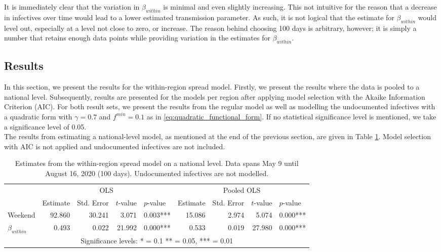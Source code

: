\documentclass[12pt]{article}
\begin{document}
	It is immediately clear that the variation in $\beta_{within}$ is minimal and even slightly increasing. This not intuitive for the reason that a decrease in infectives over time would lead to a lower estimated transmission parameter. As such, it is not logical that the estimate for $\beta_{within}$ would level out, especially at a level not close to zero, or increase. The reason behind choosing 100 days is arbitrary, however; it is simply a number that retains enough data points while providing variation in the estimates for $\beta_{within}$.
	
    \subsection{Results} \label{subsec:model_within_results}
	In this section, we present the results for the within-region spread model. Firstly, we present the results where the data is pooled to a national level. Subsequently, results are presented for the models per region after applying model selection with the Akaike Information Criterion (AIC). For both result sets, we present the results from the regular model as well as modelling the undocumented infectives with a quadratic form with $\gamma = 0.7$ and $f^{min} = 0.1$ as in \eqref{eq:quadratic_functional_form}. If no statistical significance level is mentioned, we take a significance level of 0.05. \\
	
	The results from estimating a national-level model, as mentioned at the end of the previous section, are given in Table \ref{tab:results_within_national}. Model selection with AIC is not applied and undocumented infectives are not included.
	
	\begin{table}[H]
	    \centering
	    \caption{Estimates from the within-region spread model on a national level. Data spans May 9 until August 16, 2020 (100 days). Undocumented infectives are not modelled.}
		\label{tab:results_within_national}
	    \begin{tabular}{lrrrlrrrl}
	        \toprule
    		& \multicolumn{4}{c}{OLS} & \multicolumn{4}{c}{Pooled OLS} \\
    		                \cmidrule(lr){2-5}
                            \cmidrule(lr){6-9}
    		& Estimate & Std. Error & $t$-value & $p$-value & Estimate & Std. Error & $t$-value & $p$-value \\* \midrule
    		Weekend             & 92.860 & 30.241 & 3.071 & 0.003*** & 15.086 & 2.974 & 5.074 & 0.000*** \\*
    		$\beta_{within}$    & 0.493 & 0.022 & 21.992 & 0.000*** & 0.533 & 0.019 & 27.980 & 0.000*** \\* \bottomrule
    		\multicolumn{9}{c}{Significance levels: * = 0.1 ** = 0.05, *** = 0.01}
	    \end{tabular}
	\end{table}
	
\end{document}
